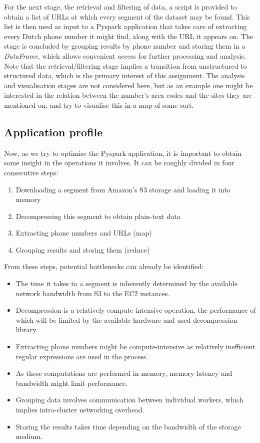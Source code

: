 \documentclass{article}
\begin{document}
For the next stage, the retrieval and filtering of data, a script is provided to obtain a list of URLs at which every segment of the dataset may be found.
This list is then used as input to a Pyspark application that takes care of extracting every Dutch phone number it might find, along with the URL it appears on.
The stage is concluded by grouping results by phone number and storing them in a \emph{DataFrame}, which allows convenient access for further processing and analysis.
Note that the retrieval/filtering stage implies a transition from unstructured to structured data, which is the primary interest of this assignment.
The analysis and visualisation stages are not considered here, but as an example one might be interested in the relation between the number's area codes and the sites they are mentioned on, and try to visualise this in a map of some sort.

\subsection{Application profile}

Now, as we try to optimise the Pyspark application, it is important to obtain some insight in the operations it involves.
It can be roughly divided in four consecutive steps:

\begin{enumerate}
	\item Downloading a segment from Amazon's S3 storage and loading it into memory
	\item Decompressing this segment to obtain plain-text data
	\item Extracting phone numbers and URLs (map)
	\item Grouping results and storing them (reduce)
\end{enumerate}

From these steps, potential bottlenecks can already be identified:

\begin{itemize}

	\item The time it takes to a segment is inherently determined by the available network bandwidth from S3 to the EC2 instances.
	\item Decompression is a relatively compute-intensive operation, the performance of which will be limited by the available hardware and used decompression library.
	\item Extracting phone numbers might be compute-intensive as relatively inefficient regular expressions are used in the process.
	\item As these computations are performed in-memory, memory latency and bandwidth might limit performance.
	\item Grouping data involves communication between individual workers, which implies intra-cluster networking overhead.
	\item Storing the results takes time depending on the bandwidth of the storage medium.
\end{itemize}
\end{document}

